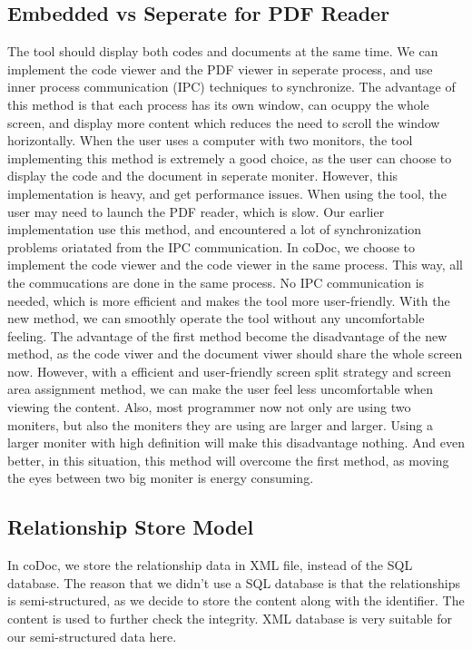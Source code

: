 \documentclass[11pt,letterpaper,oneside]{article}
\begin{document}
\subsection{Embedded vs Seperate for PDF Reader}
The tool should display both codes and documents at the same time.
We can implement the code viewer and the PDF viewer in seperate process,
and use inner process communication (IPC) techniques to synchronize.
The advantage of this method is that each process has its own window,
can ocuppy the whole screen,
and display more content which reduces the need to scroll the window horizontally.
When the user uses a computer with two monitors,
the tool implementing this method is extremely a good choice,
as the user can choose to display the code and the document in seperate moniter.
However, this implementation is heavy,
and get performance issues.
When using the tool, 
the user may need to launch the PDF reader,
which is slow.
Our earlier implementation use this method,
and encountered a lot of synchronization problems oriatated from the IPC communication.
In coDoc, we choose to implement the code viewer and the code viewer in the same process.
This way, all the commucations are done in the same process.
No IPC communication is needed,
which is more efficient and makes the tool more user-friendly.
With the new method, we can smoothly operate the tool without any uncomfortable feeling.
The advantage of the first method become the disadvantage of the new method,
as the code viwer and the document viwer should share the whole screen now.
However, with a efficient and user-friendly screen split strategy and screen area assignment method,
we can make the user feel less uncomfortable when viewing the content.
Also, most programmer now not only are using two moniters, 
but also the moniters they are using are larger and larger.
Using a larger moniter with high definition will make this disadvantage nothing.
And even better, in this situation, this method will overcome the first method,
as moving the eyes between two big moniter is energy consuming.

\subsection{Relationship Store Model}
In coDoc, we store the relationship data in XML file, 
instead of the SQL database.
The reason that we didn't use a SQL database is that the relationships is semi-structured,
as we decide to store the content along with the identifier.
The content is used to further check the integrity.
XML database is very suitable for our semi-structured data here.
\end{document}
